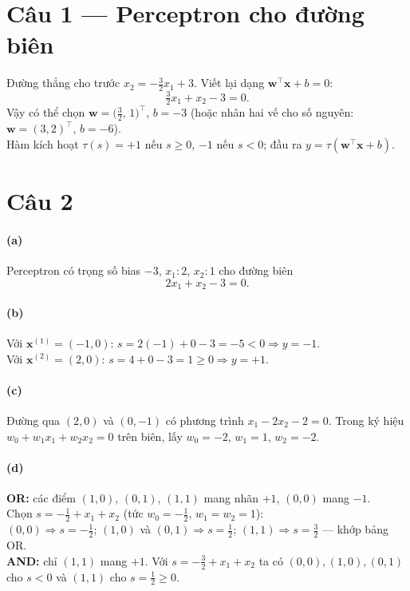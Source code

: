 \section*{Câu 1 --- Perceptron cho đường biên}
Đường thẳng cho trước $x_2 = -\tfrac{3}{2}x_1 + 3$. Viết lại dạng $\mathbf{w}^\top\mathbf{x}+b=0$:
\[
\tfrac{3}{2}x_1 + x_2 - 3 = 0.
\]
Vậy có thể chọn $\mathbf{w} = \bigl(\tfrac{3}{2},\,1\bigr)^\top$, $b=-3$ (hoặc nhân hai vế cho số nguyên: $\mathbf{w}=(3,2)^\top$, $b=-6$).\\
Hàm kích hoạt $\tau(s)=+1$ nếu $s\ge 0$, $-1$ nếu $s<0$; đầu ra $y=\tau(\mathbf{w}^\top\mathbf{x}+b)$.

\section*{Câu 2}
\paragraph{(a)} Perceptron có trọng số bias $-3$, $x_1:2$, $x_2:1$ cho đường biên
\[
2x_1 + x_2 - 3 = 0.
\]

\paragraph{(b)} Với $\mathbf{x}^{(1)}=(-1,0)$: $s = 2(-1)+0-3=-5<0 \Rightarrow y=-1$.\\
Với $\mathbf{x}^{(2)}=(2,0)$: $s=4+0-3=1\ge 0 \Rightarrow y=+1$.

\paragraph{(c)} Đường qua $(2,0)$ và $(0,-1)$ có phương trình $x_1-2x_2-2=0$. Trong ký hiệu $w_0 + w_1x_1+w_2x_2=0$ trên biên, lấy $w_0=-2$, $w_1=1$, $w_2=-2$.

\paragraph{(d)} \textbf{OR:} các điểm $(1,0)$, $(0,1)$, $(1,1)$ mang nhãn $+1$, $(0,0)$ mang $-1$.\\
Chọn $s = -\tfrac{1}{2}+x_1+x_2$ (tức $w_0=-\tfrac{1}{2}$, $w_1=w_2=1$):\\
$(0,0)\Rightarrow s=-\tfrac{1}{2}$; $(1,0)$ và $(0,1)\Rightarrow s=\tfrac{1}{2}$; $(1,1)\Rightarrow s=\tfrac{3}{2}$ --- khớp bảng OR.\\
\textbf{AND:} chỉ $(1,1)$ mang $+1$. Với $s=-\tfrac{3}{2}+x_1+x_2$ ta có $(0,0),(1,0),(0,1)$ cho $s<0$ và $(1,1)$ cho $s=\tfrac{1}{2}\ge 0$.

